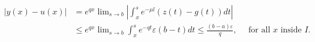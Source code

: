 \documentclass[mla8]{mla}
\begin{document}
\begin{paper}
\begin{center}
    $\begin{aligned}|y(x)-u(x)| & =e^{q x} \lim _{s \rightarrow b}\left|\int_x^s e^{-\mu l}(z(t)-g(t)) d t\right| \\ & \leq e^{q x} \lim _{s \rightarrow b} \int_x^s e^{-q t} \varepsilon(b-t) d t \leq \frac{(b-a) \varepsilon}{q}, \quad \text { for all } x \text{ inside } I .\end{aligned}$
\end{center}





\end{paper}
\nocite{*}
\begin{workscited}

    \printbibliography[heading=none]
    
\end{workscited}
\end{document}
